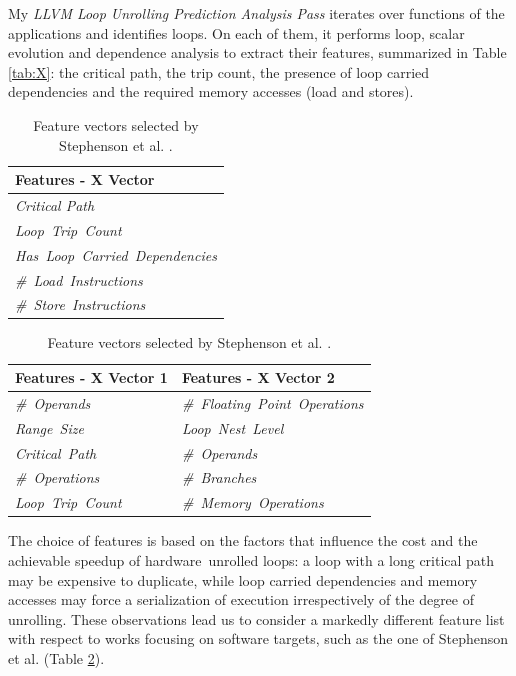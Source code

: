 \documentclass[]{usiinfthesis}
\newcommand{\HW}{{hardware}}
\begin{document}
My \textit{LLVM Loop Unrolling Prediction Analysis Pass} iterates over functions
of the applications and identifies loops. On each of them, it performs
loop, scalar evolution and dependence analysis to extract their
features, summarized in Table \ref{tab:X}: the critical path, the trip
count, the presence of loop carried dependencies and the required
memory accesses (load and stores).\par

%
%
\begin{table}[h]
  \centering

  \small\addtolength{\tabcolsep}{-3pt}
  \vspace{1em}
  \begin{tabular}{| l |} 
 \hline    
 \textbf{Features - X Vector}  \\ \hline
    \emph{Critical Path}      \\ \hline
   \emph{ Loop\ Trip\ Count} \\ \hline
   \emph{ Has\ Loop\ Carried\ Dependencies}     \\ \hline
   \emph{ \#\ Load\ Instructions}     \\ \hline
   \emph{ \#\ Store\ Instructions}      \\ \hline
  \end{tabular} 
    \caption{Features extracted by LLVM LU Analysis Pass.}
      \label{tab:X}
  
  
     \vspace{2em}
  

  \begin{tabular}{| l | l |} 
 \hline    
 \textbf{Features - X Vector 1} & \textbf{Features - X Vector 2}  \\ \hline
  \emph{\#\ Operands}        &\emph{\#\ Floating\ Point\ Operations}        \\ \hline
  \emph{Range\ Size}     &\emph{Loop\ Nest\ Level}   \\ \hline
    \emph{Critical\ Path}   &\emph{\#\ Operands}  \\ \hline
  \emph{\#\ Operations}      &\emph{\#\ Branches}   \\ \hline
  \emph{Loop\ Trip\ Count}&\emph{\#\ Memory\ Operations}   \\ \hline
  \end{tabular}
    \caption{Feature vectors selected by Stephenson et al. \cite{StephensonApr05}.}
      \label{tab:St_X1_X2}
\end{table}

The choice of features is based on the factors that influence the cost
and the achievable speedup of \HW\ unrolled loops: a loop with a
long critical path may be expensive to duplicate, while loop carried
dependencies and memory accesses may force a serialization of
execution irrespectively of the degree of unrolling. These
observations lead us to consider a markedly different feature list
with respect to works focusing on software targets, such as the one of
Stephenson et al. (Table \ref{tab:St_X1_X2}).\par
\end{document}

